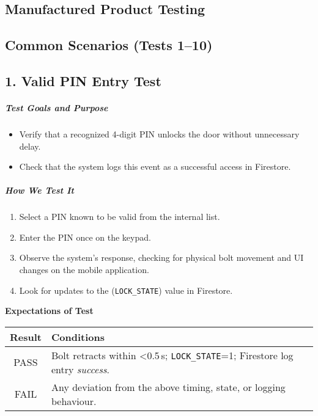 \newpage
\begin{samepage}
    \section{Manufactured Product Testing}
    \subsection{Common Scenarios (Tests 1–10)}
    \subsection*{1. Valid PIN Entry Test}
    \subparagraph{Test Goals and Purpose}
    \begin{itemize}
        \item Verify that a recognized 4-digit PIN unlocks the door without unnecessary delay.
        \item Check that the system logs this event as a successful access in Firestore.
    \end{itemize}
    \subparagraph{How We Test It}
    \begin{enumerate}
        \item Select a PIN known to be valid from the internal list.
        \item Enter the PIN once on the keypad.
        \item Observe the system's response, checking for physical bolt movement and UI changes on the mobile application.
        \item Look for updates to the (\texttt{LOCK\_STATE}) value in Firestore.
    \end{enumerate}
    
    \textbf{Expectations of Test}
    \begin{center}
    \begin{tabular}{|c|p{10cm}|}
      \hline
      \textbf{Result} & \textbf{Conditions} \\
      \hline
      PASS & Bolt retracts within \textless{}0.5\,s; \texttt{LOCK\_STATE}=1; Firestore log entry \emph{success}. \\
      \hline
      FAIL & Any deviation from the above timing, state, or logging behaviour. \\
      \hline
    \end{tabular}
    \end{center}
\end{samepage}


